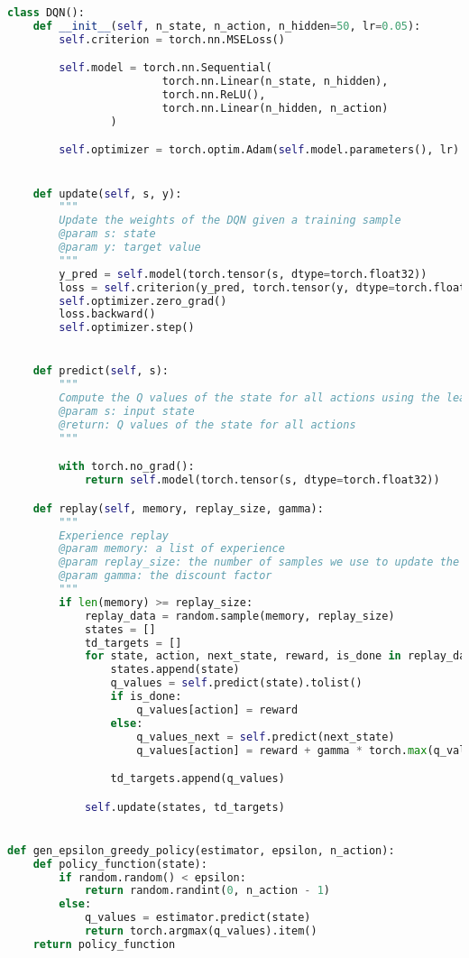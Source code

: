 \begin{lstlisting}[language=Python]
class DQN():
    def __init__(self, n_state, n_action, n_hidden=50, lr=0.05):
        self.criterion = torch.nn.MSELoss()

        self.model = torch.nn.Sequential(
                        torch.nn.Linear(n_state, n_hidden),
                        torch.nn.ReLU(),
                        torch.nn.Linear(n_hidden, n_action)
                )

        self.optimizer = torch.optim.Adam(self.model.parameters(), lr)


    def update(self, s, y):
        """
        Update the weights of the DQN given a training sample
        @param s: state
        @param y: target value
        """
        y_pred = self.model(torch.tensor(s, dtype=torch.float32))
        loss = self.criterion(y_pred, torch.tensor(y, dtype=torch.float32))
        self.optimizer.zero_grad()
        loss.backward()
        self.optimizer.step()


    def predict(self, s):
        """
        Compute the Q values of the state for all actions using the learning model
        @param s: input state
        @return: Q values of the state for all actions
        """

        with torch.no_grad():
            return self.model(torch.tensor(s, dtype=torch.float32))

    def replay(self, memory, replay_size, gamma):
        """
        Experience replay
        @param memory: a list of experience
        @param replay_size: the number of samples we use to update the model each time
        @param gamma: the discount factor
        """
        if len(memory) >= replay_size:
            replay_data = random.sample(memory, replay_size)
            states = []
            td_targets = []
            for state, action, next_state, reward, is_done in replay_data:
                states.append(state)
                q_values = self.predict(state).tolist()
                if is_done:
                    q_values[action] = reward
                else:
                    q_values_next = self.predict(next_state)
                    q_values[action] = reward + gamma * torch.max(q_values_next).item()

                td_targets.append(q_values)

            self.update(states, td_targets)


def gen_epsilon_greedy_policy(estimator, epsilon, n_action):
    def policy_function(state):
        if random.random() < epsilon:
            return random.randint(0, n_action - 1)
        else:
            q_values = estimator.predict(state)
            return torch.argmax(q_values).item()
    return policy_function



\end{lstlisting}
